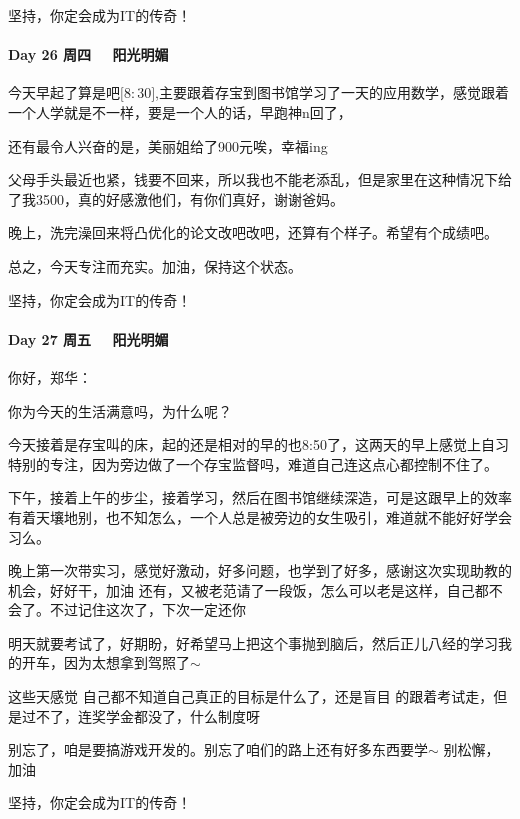 \documentclass[UTF8,a4paper,8pt]{ctexart}
\begin{document}
 		     坚持，你定会成为IT的传奇！
 		     
 	 \paragraph{Day 26  周四 \  \ 阳光明媚}
 		 今天早起了算是吧$\big[8:30\big]$,主要跟着存宝到图书馆学习了一天的应用数学，感觉跟着一个人学就是不一样，要是一个人的话，早跑神n回了，
 		 
 		 还有最令人兴奋的是，美丽姐给了900元唉，幸福ing
 		 
 		 父母手头最近也紧，钱要不回来，所以我也不能老添乱，但是家里在这种情况下给了我3500，真的好感激他们，有你们真好，谢谢爸妈。
 		 
 		 晚上，洗完澡回来将凸优化的论文改吧改吧，还算有个样子。希望有个成绩吧。
 		 
 		 总之，今天专注而充实。加油，保持这个状态。
 		  
 		 坚持，你定会成为IT的传奇！
 		 
 		 
 	  \paragraph{Day 27  周五 \  \ 阳光明媚}
 	  
 	    你好，郑华：
 	    
 	    你为今天的生活满意吗，为什么呢？
 	    
 	    今天接着是存宝叫的床，起的还是相对的早的也8:50了，这两天的早上感觉上自习特别的专注，因为旁边做了一个存宝监督吗，难道自己连这点心都控制不住了。
 	    
 	    下午，接着上午的步尘，接着学习，然后在图书馆继续深造，可是这跟早上的效率有着天壤地别，也不知怎么，一个人总是被旁边的女生吸引，难道就不能好好学会习么。
 	    
 	    晚上第一次带实习，感觉好激动，好多问题，也学到了好多，感谢这次实现助教的机会，好好干，加油
 	    还有，又被老范请了一段饭，怎么可以老是这样，自己都不会了。不过记住这次了，下次一定还你~
 	    
 	    明天就要考试了，好期盼，好希望马上把这个事抛到脑后，然后正儿八经的学习我的开车，因为太想拿到驾照了$\sim$
 	    
 	    这些天感觉 自己都不知道自己真正的目标是什么了，还是盲目 的跟着考试走，但是过不了，连奖学金都没了，什么制度呀~
 	    
 	    别忘了，咱是要搞游戏开发的。别忘了咱们的路上还有好多东西要学$\sim$ 别松懈，加油
 	    
 	    坚持，你定会成为IT的传奇！
 	    
\end{document}
